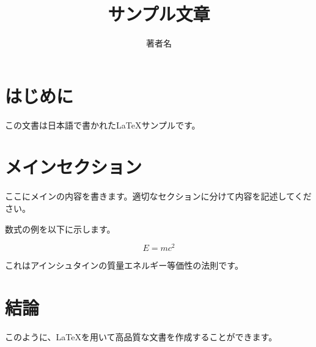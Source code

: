 \documentclass[a4paper,11pt]{jsarticle}
\title{サンプル文章}
\author{著者名}
\begin{document}
\maketitle

\section{はじめに}
この文書は日本語で書かれたLaTeXサンプルです。

\lipsum[1] %

\section{メインセクション}
ここにメインの内容を書きます。適切なセクションに分けて内容を記述してください。

数式の例を以下に示します。

\begin{equation}
E = mc^2
\end{equation}

これはアインシュタインの質量エネルギー等価性の法則です。

\section{結論}
このように、LaTeXを用いて高品質な文書を作成することができます。
\end{document}

